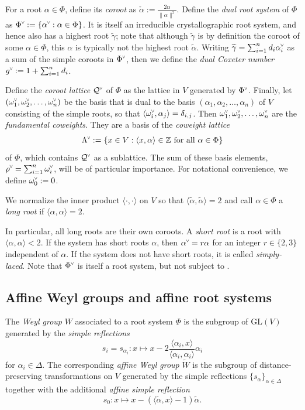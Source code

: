 \documentclass[ALCO,published]{cedram}
\newcommand{\darkblue}{\color{darkblue}} %
\newcommand{\defn}[1]{\emph{\darkblue #1}}
\newcommand{\chk}[1]{#1^{\normalfont\smash{\scalebox{.5}[.5]{\rotatebox{90}{\textbf{\textless}}}}}}
\newcommand{\Z}{\mathbb{Z}}
\newcommand{\wa}{\widetilde{W}}
\newcommand{\Q}{\mathcal{Q}}
\newcommand{\cw}{\chk{\omega}}
\newcommand{\cwl}{\chk{\Lambda}}
\newcommand{\amax}{\tilde{\alpha}}
\begin{document}
For a root $\alpha\in\Phi$, define its \defn{coroot} as $\check{\alpha}:=\frac{2\alpha}{\|\alpha\|^2}$.
Define the \defn{dual root system} of $\Phi$ as $\chk{\Phi}:=\left\{\chk{\alpha}:\alpha\in\Phi\right\}$. It is itself an irreducible crystallographic root system, and hence also has a highest root $\widetilde{\gamma}$; note that although $\widetilde{\gamma}$ is by definition the coroot of some $\alpha\in\Phi$, this $\alpha$ is typically not the highest root $\amax$. Writing $\widetilde{\gamma}=\sum_{i=1}^n d_i\chk{\alpha_i}$ as a sum of the simple coroots in $\chk{\Phi}$, then we define the \defn{dual Coxeter number} $\chk{g}:=1+\sum_{i=1}^n d_i$.

Define the \defn{coroot lattice} $\chk{\Q}$ of $\Phi$ as the lattice in $V$ generated by $\chk{\Phi}$. Finally, let $(\cw_1,\cw_2,\ldots,\cw_n)$ be the basis that is dual to the basis $(\alpha_1,\alpha_2,\ldots,\alpha_n)$ of $V$ consisting of the simple roots, so that $\langle \cw_i,\alpha_j\rangle=\delta_{i,j}$.
Then $\cw_1,\cw_2,\ldots,\cw_n$ are the \defn{fundamental coweights}. They are a basis of the \defn{coweight lattice} 
\[\cwl:=\{x\in V:\langle x,\alpha\rangle\in\Z\text{ for all }\alpha\in\Phi\}\]
of $\Phi$, which contains $\chk{\Q}$ as a sublattice. The sum of these basis elements, $\chk{\rho}=\sum_{i=1}^n\cw_i$, will be of particular importance. For notational convenience, we define $\cw_0:=0$.

\begin{nota}\label{con:normalize}
We normalize the inner product $\langle\cdot,\cdot\rangle$ on $V$ so that $
\langle\amax,\amax\rangle=2$ and call $\alpha \in \Phi$ a \defn{long root} if $\langle \alpha,\alpha \rangle=2$.
\end{nota}

In particular, all long roots are their own coroots.  A \defn{short root} is a root with $\langle \alpha,\alpha \rangle<2$.  If the system has short roots $\alpha$, then $\chk{\alpha}=r\alpha$ for an integer $r\in \{2,3\}$ independent of $\alpha$. If the system does not have short roots, it is called \defn{simply-laced}.  Note that $\chk{\Phi}$ is itself a root system, but not subject to .

\subsection{Affine Weyl groups and affine root systems}
\label{sec:affine}

The \defn{Weyl group} $W$ associated to a root system $\Phi$ is the subgroup of $\mathrm{GL}(V)$ generated by the \defn{simple reflections} \[s_i=s_{\alpha_i} : x\mapsto x - 2\frac{\langle \alpha_i,x\rangle}{\langle \alpha_i,\alpha_i\rangle}\alpha_i\] for $\alpha_i \in \Delta$. The corresponding \defn{affine Weyl group} $\wa$ is the subgroup of distance-preserving transformations on $V$ generated by the simple reflections $\{s_\alpha\}_{\alpha \in \Delta}$ together with the additional \defn{affine simple reflection} \[s_0: x\mapsto x - (\langle \widetilde{\alpha},x\rangle-1)\widetilde{\alpha}.\]
\end{document}
